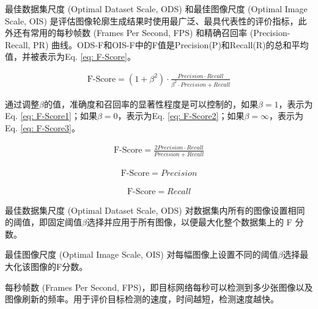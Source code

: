 \documentclass[a4paper, 10pt]{article}
\begin{document}
			最佳数据集尺度 (Optimal Dataset Scale, ODS) 和最佳图像尺度 (Optimal Image Scale, OIS) 是评估图像轮廓生成结果时使用最广泛、最具代表性的评价指标，此外还有常用的每秒帧数 (Frames Per Second, FPS) 和精确召回率 (Precision-Recall, PR) 曲线。ODS-F和OIS-F中的F值是Precision(P)和Recall(R)的总和平均值，并被表示为Eq. \ref{eq: F-Score}。
			
			\begin{equation}
				\begin{aligned}
					\text{F-Score} = \left(1+\beta^2\right) \cdot \frac{Precision \cdot Recall}{\beta^2 \cdot Precision + Recall}
				\end{aligned}
				\label{eq: F-Score}
			\end{equation}
			
			通过调整$\beta$的值，准确度和召回率的显著性程度是可以控制的，如果$\beta = 1$，表示为Eq. \ref{eq: F-Score1}；如果$\beta = 0$，表示为Eq. \ref{eq: F-Score2}；如果$\beta = \infty$，表示为Eq. \ref{eq: F-Score3}。
			
			\begin{equation}
				\begin{aligned}
					\text{F-Score} = \frac{2Precision \cdot Recall}{Precision + Recall}
				\end{aligned}
				\label{eq: F-Score1}
			\end{equation}
			
			\begin{equation}
				\begin{aligned}
					\text{F-Score} = Precision
				\end{aligned}
				\label{eq: F-Score2}
			\end{equation}
			
			\begin{equation}
				\begin{aligned}
					\text{F-Score} = Recall
				\end{aligned}
				\label{eq: F-Score3}
			\end{equation}
			
			最佳数据集尺度 (Optimal Dataset Scale, ODS) 对数据集内所有的图像设置相同的阈值，即固定阈值$\beta$选择并应用于所有图像，以便最大化整个数据集上的 F 分数。
			
			最佳图像尺度 (Optimal Image Scale, OIS) 对每幅图像上设置不同的阈值$\beta$选择最大化该图像的F分数。
			
			每秒帧数 (Frames Per Second, FPS)，即目标网络每秒可以检测到多少张图像以及图像刷新的频率。用于评价目标检测的速度，时间越短，检测速度越快。
			
\end{document}
